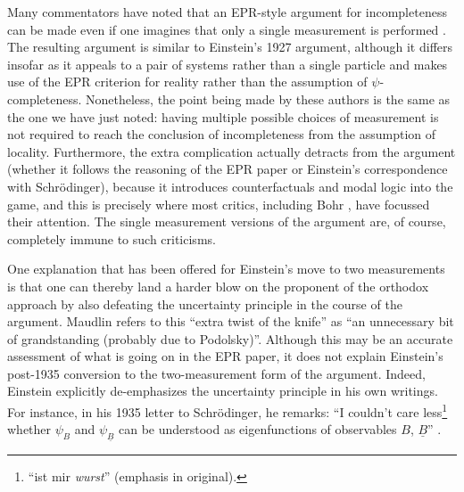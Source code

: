 \documentclass[aps,nofootinbib,12pt]{revtex4-2}
\begin{document}
Many commentators have noted that an EPR-style argument for
incompleteness can be made even if one imagines that only a single
measurement is performed \cite{Hardy1995,Redhead,Fine,Maudlin}. The
resulting argument is similar to Einstein's 1927 argument, although
it differs insofar as it appeals to a pair of systems rather than a
single particle and makes use of the EPR criterion for reality
rather than the assumption of $\psi$-completeness. Nonetheless, the
point being made by these authors is the same as the one we have
just noted: having multiple possible choices of measurement is not
required to reach the conclusion of incompleteness from the
assumption of locality. Furthermore, the extra complication actually
detracts from the argument (whether it follows the reasoning of the
EPR paper or Einstein's correspondence with Schr\"{o}dinger),
because it introduces counterfactuals and modal logic into the game,
and this is precisely where most critics, including Bohr
\cite{Bohr_replytoEPR}, have focussed their attention. The single
measurement versions of the argument are, of course, completely
immune to such criticisms.

One explanation that has been offered for Einstein's move to two
measurements is that one can thereby land a harder blow on the
proponent of the orthodox approach by also defeating the uncertainty
principle in the course of the argument. Maudlin refers to this
``extra twist of the knife'' as ``an unnecessary bit of
grandstanding (probably due to Podolsky)''\cite{Maudlin}. Although
this may be an accurate assessment of what is going on in the EPR
paper, it does not explain Einstein's post-1935 conversion to the
two-measurement form of the argument. Indeed, Einstein explicitly
de-emphasizes the uncertainty principle in his own writings. For
instance, in his 1935 letter to Schr\"{o}dinger, he remarks: ``I
couldn't care less\footnote{``ist mir \textit{wurst}'' (emphasis in
original).} whether $\psi_{B}$ and $\psi_{\underline{B}}$ can be
understood as eigenfunctions of observables $B$,
$\underline{B}$'' \cite{EtoS1935}.

\end{document}
